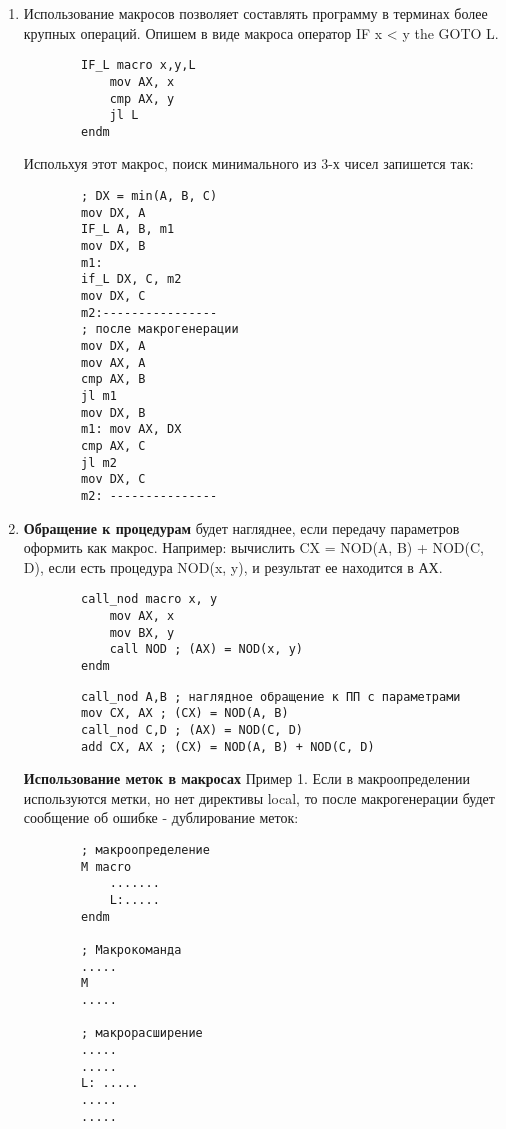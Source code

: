 \begin{enumerate}
    \item Использование макросов позволяет составлять программу в терминах более крупных операций. Опишем в виде макроса оператор IF x < y the GOTO L.
    \begin{verbatim}
        IF_L macro x,y,L
            mov AX, x
            cmp AX, y
            jl L
        endm
    \end{verbatim}
    Испольхуя этот макрос, поиск минимального из 3-х чисел запишется так:
    \begin{verbatim}
        ; DX = min(A, B, C)
        mov DX, A
        IF_L A, B, m1
        mov DX, B
        m1:
        if_L DX, C, m2
        mov DX, C
        m2:----------------
        ; после макрогенерации
        mov DX, A
        mov AX, A
        cmp AX, B
        jl m1
        mov DX, B
        m1: mov AX, DX
        cmp AX, C
        jl m2
        mov DX, C
        m2: ---------------
    \end{verbatim}
    \item \textbf{Обращение к процедурам} будет нагляднее, если передачу параметров оформить как макрос.
    Например: вычислить CX = NOD(A, B) + NOD(C, D), если есть процедура NOD(x, y), и результат ее находится в АХ.
    \begin{verbatim}
        call_nod macro x, y
            mov AX, x
            mov BX, y
            call NOD ; (AX) = NOD(x, y)
        endm
    \end{verbatim}

    \begin{verbatim}
        call_nod A,B ; наглядное обращение к ПП с параметрами
        mov CX, AX ; (CX) = NOD(A, B)
        call_nod C,D ; (AX) = NOD(C, D)
        add CX, AX ; (CX) = NOD(A, B) + NOD(C, D)
    \end{verbatim}

    \textbf{Использование меток в макросах}
    Пример 1. Если в макроопределении используются метки, но нет директивы local, то после макрогенерации будет сообщение об ошибке - дублирование меток:
    \begin{verbatim}
        ; макроопределение
        M macro
            .......
            L:.....
        endm

        ; Макрокоманда
        .....
        M
        .....

        ; макрорасширение
        .....
        .....
        L: .....
        .....
        .....
    \end{verbatim}
\end{enumerate}

